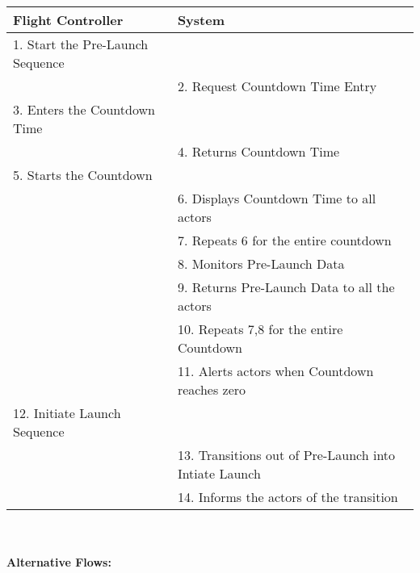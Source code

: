 \documentclass[letterpaper]{article}
\begin{document}
\begin{tabular}{|p{5.75cm}|p{5.75cm}|}\hline
\textbf{Flight Controller} & \textbf{System}\\\hline
1.  Start the Pre-Launch Sequence & \\\hline
& 2. Request Countdown Time Entry\\\hline
3.  Enters the Countdown Time & \\\hline
& 4.  Returns Countdown Time\\\hline
5.  Starts the Countdown  & \\\hline
& 6.  Displays Countdown Time to all actors\\\hline
& 7.  Repeats 6 for the entire countdown\\\hline
& 8.  Monitors Pre-Launch Data\\\hline
& 9. Returns Pre-Launch Data to all the actors\\\hline
& 10.  Repeats 7,8 for the entire Countdown\\\hline
& 11.  Alerts actors when Countdown reaches zero\\\hline
12.  Initiate Launch Sequence & \\\hline
& 13.  Transitions out of Pre-Launch into Intiate Launch\\\hline
& 14.  Informs the actors of the transition\\\hline
\end{tabular}\\\\
\textbf{Alternative Flows:  }
\end{document}
